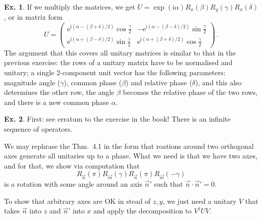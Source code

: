 \documentclass[a4paper,12pt]{article}
\def\e{\mathrm{e}}
\def\imagi{\mathrm{i}}
\theoremstyle{definition}
\newtheorem{exercise}{Ex.}[section]
\begin{document}
\begin{exercise}
 If we multiply the matrices, we get $U=\exp(\imagi \alpha)R_x(\beta) R_y(\gamma) R_x(\delta)$, or in matrix form
 \[
  U=\begin{pmatrix}
     \e^{\imagi(\alpha-(\beta+\delta)/2)}\cos\frac{\gamma}{2} & -\e^{\imagi(\alpha-(\beta-\delta)/2)}\sin\frac{\gamma}{2}\\
     \e^{\imagi(\alpha+(\beta-\delta)/2)}\sin\frac{\gamma}{2} & \e^{\imagi(\alpha+(\beta+\delta)/2)}\cos\frac{\gamma}{2}
    \end{pmatrix}\,.
 \]
 The argument that this covers all unitary matrices is similar to that in the previous exercise: the rows of a unitary matrix have to be normalised and unitary; a single 2-component unit vector has the following parameters: magnitude angle ($\gamma$), common phase ($\beta$) and relative phase ($\delta$), and this also determines the other row, the angle $\beta$ becomes the relative phase of the two rows, and there is a new common phase $\alpha$.
\end{exercise}

\begin{exercise}
 First: see erratum to the exercise in the book! There is an infinite sequence of operators.
 
 We may rephrase the Thm.\ 4.1 in the form that roations around two orthogonal axes generate all unitaries up to a phase. What we need is that we have two axes, and for that, we show via computation that
 \[
  R_{\vec{n}}(\pi)R_{\vec{m}}(\gamma)R_{\vec{n}}(\pi)R_{\vec{m}}(-\gamma)
 \]
 is a rotation with some angle around an axis $\vec{n}'$ such that $\vec{n}\cdot\vec{n}'=0$.
 
 To show that arbitrary axes are OK in stead of $z, y$, we just need a unitary $V$ that takes $\vec{n}$ into $z$ and $\vec{n}'$ into $x$ and apply the decomposition to $V^\dagger U V$.
\end{exercise}
\end{document}
